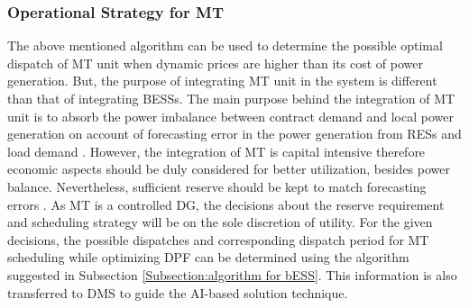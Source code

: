 \documentclass[journal]{IEEEtran}
\begin{document}
\subsubsection{Operational Strategy for MT}
The above mentioned algorithm can be used to determine the possible optimal dispatch of MT unit when dynamic prices are higher than its cost of power generation. But, the purpose of integrating MT unit in the system is different than that of integrating BESSs. The main purpose behind the integration of MT unit is to absorb the power imbalance between contract demand and local power generation on account of forecasting error in the power generation from RESs and load demand \cite{8353004}. However, the integration of MT is capital intensive therefore economic aspects should be duly considered for better utilization, besides power balance. Nevertheless, sufficient reserve should be kept to match forecasting errors \cite{7973037}. As MT is a controlled DG, the decisions about the reserve requirement and scheduling strategy will be on the sole discretion of utility. For the given decisions, the possible dispatches and corresponding dispatch period for MT scheduling while optimizing DPF can be determined using the algorithm suggested in Subsection \ref{Subsection:algorithm for bESS}. This information is also transferred to DMS to guide the AI-based solution technique. 
\end{document}
